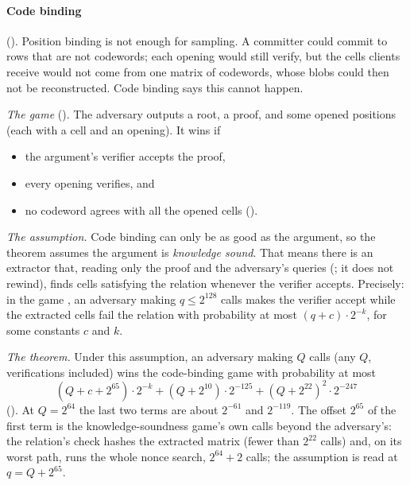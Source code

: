 \documentclass[11pt]{article}
\begin{document}
\paragraph{Code binding} (). Position binding is not enough for
sampling. A committer could commit to rows that are not codewords; each opening would still
verify, but the cells clients receive would not come from one matrix of codewords, whose blobs could then not
be reconstructed. Code binding says this cannot happen.

\emph{The game} (). The adversary outputs a root, a proof, and some opened
positions (each with a cell and an opening). It wins if
\begin{itemize}
\item the argument's verifier accepts the proof,
\item every opening verifies, and
\item no codeword agrees with all the opened cells ().
\end{itemize}

\emph{The assumption.} Code binding can only be as good as the argument, so the theorem assumes the
argument is \emph{knowledge sound}. That means there is an extractor that, reading only the proof
and the adversary's queries (; it does not rewind), finds cells satisfying the
relation whenever the verifier accepts. Precisely: in the game , an adversary making
$q \le 2^{128}$ calls makes the verifier accept while the extracted cells fail the relation with
probability at most $(q + c)\cdot 2^{-k}$, for some constants $c$ and $k$.

\emph{The theorem.} Under this assumption, an adversary making $Q$ calls (any $Q$, verifications
included) wins the code-binding game with probability at most
\[
\boxed{\ (Q + c + 2^{65})\cdot 2^{-k} + (Q + 2^{10})\cdot 2^{-125} + (Q + 2^{22})^2\cdot 2^{-247}\ }
\]
(). At $Q = 2^{64}$ the last two terms are about
$2^{-61}$ and $2^{-119}$. The offset $2^{65}$ of the first term is the knowledge-soundness game's
own calls beyond the adversary's: the relation's check hashes the extracted matrix (fewer than
$2^{22}$ calls) and, on its worst path, runs the whole nonce search, $2^{64} + 2$ calls; the
assumption is read at $q = Q + 2^{65}$.
\end{document}
